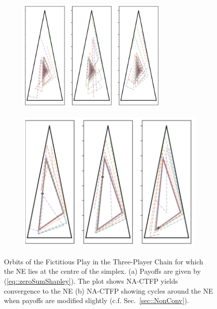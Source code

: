 \documentclass{article}
\theoremstyle{definition}
\begin{document}
  \begin{figure}[t]
    \centering
    \begin{subfigure}[b]{0.45 \textwidth}
      \includegraphics[width = 0.8\textwidth]{Figures/convergentShapley.png}
    \caption{\label{fig::convergentShapley}}
    \end{subfigure}
    \begin{subfigure}[b]{0.45 \textwidth}
      \includegraphics[width = 0.8 \textwidth]{Figures/nonConvergentShapley.png}
      \caption{\label{fig::nonconvergentShapley}}
    \end{subfigure}
    \caption{\label{fig::Shapley} Orbits of the Fictitious Play in the Three-Player Chain for which the NE lies at the centre of the simplex. (a) Payoffs are given by
    (\ref{eq::zeroSumShapley}). The plot shows NA-CTFP yields convergence to the NE (b)
	NA-CTFP showing cycles around the NE when payoffs are modified slightly (c.f. Sec.~\ref{sec::NonConv}).}
  \end{figure}
\end{document}

